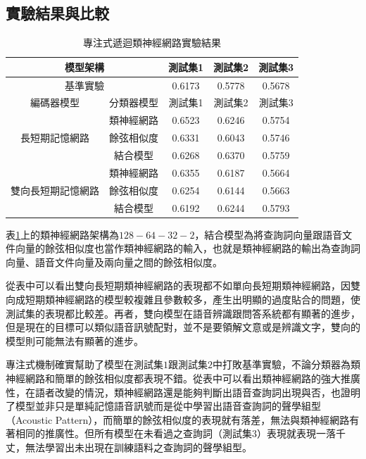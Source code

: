 \subsection{實驗結果與比較}
\begin{table}[ht]
	 \centering
	 \caption{專注式遞迴類神經網路實驗結果}
	 \label{table:ch4_att_exp}
	 \begin{tabular}{|c|c|c|c|c|}
		 \hline
		 \multicolumn{2}{|c|}{模型架構} & 測試集1 & 測試集2 & 測試集3 \\
		 \hline
		 \multicolumn{2}{|c|}{基準實驗} & 0.6173 & 0.5778 & 0.5678\\
		 \hline
		 \hline 
		 編碼器模型 & 分類器模型 & 測試集1 &測試集2 & 測試集3 \\
		 \hline
		 \multirow{3}{*}{長短期記憶網路} & 類神經網路 &
		 {\color{red}0.6523} &0.6246 & 0.5754\\
		 \cline{2-5}
		 & 餘弦相似度& 0.6331 & 0.6043 & 0.5746 \\
		 \cline{2-5}
		 & 結合模型 & 0.6268 & 0.6370 & 0.5759 \\ 
		 \hline
		 \multirow{3}{*}{雙向長短期記憶網路} & 類神經網路 &
		 0.6355 & 0.6187 & 0.5664\\
		 \cline{2-5}
		 & 餘弦相似度& 0.6254 & 0.6144&0.5663\\
		 \cline{2-5}
		 & 結合模型 &0.6192&0.6244&0.5793 \\
		 \hline
	   \end{tabular}
\end{table}


表\ref{table:ch4_att_exp}上的類神經網路架構為$128-64-32-2$，結合模型為將查詢詞向量跟語音文件向量的餘弦相似度也當作類神經網路的輸入，也就是類神經網路的輸出為查詢詞向量、語音文件向量及兩向量之間的餘弦相似度。

從表中可以看出雙向長短期類神經網路的表現都不如單向長短期類神經網路，因雙向成短期類神經網路的模型較複雜且參數較多，產生出明顯的過度貼合的問題，使測試集的表現都比較差。再者，雙向模型在語音辨識跟問答系統都有顯著的進步，但是現在的目標可以類似語音訊號配對，並不是要領解文意或是辨識文字，雙向的模型則可能無法有顯著的進步。

專注式機制確實幫助了模型在測試集$1$跟測試集$2$中打敗基準實驗，不論分類器為類神經網路和簡單的餘弦相似度都表現不錯。從表中可以看出類神經網路的強大推廣性，在語者改變的情況，類神經網路還是能夠判斷出語音查詢詞出現與否，也證明了模型並非只是單純記憶語音訊號而是從中學習出語音查詢詞的聲學組型（Acoustic
Pattern），而簡單的餘弦相似度的表現就有落差，無法與類神經網路有著相同的推廣性。但所有模型在未看過之查詢詞（測試集$3$）表現就表現一落千丈，無法學習出未出現在訓練語料之查詢詞的聲學組型。

